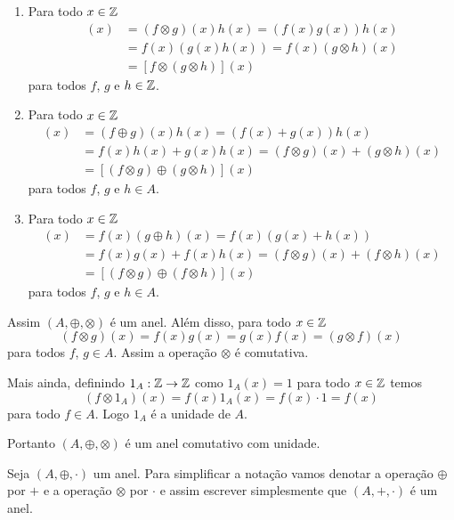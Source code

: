 \begin{exemplos}
\begin{enumerate}[label={\arabic*})]
\begin{enumerate}[label={\roman*})]
            \item Para todo $x \in \mathbb{Z}$
            \begin{align*}
                [(f \otimes g)\otimes h](x) &= (f \otimes g)(x)h(x) = (f(x)g(x))h(x)\\ &= f(x)(g(x)h(x)) = f(x)(g \otimes h)(x)\\ &= [f\otimes (g \otimes h)](x)
            \end{align*}
            para todos $f$, $g$ e $h \in \mathbb{Z}$.

            \item Para todo $x \in \mathbb{Z}$
            \begin{align*}
                [(f \oplus g)\otimes h](x) &= (f \oplus g)(x)h(x) = (f(x) + g(x))h(x) \\ &= f(x)h(x) + g(x)h(x)
                = (f\otimes g)(x) + (g \otimes h)(x)\\
                &= [(f \otimes g) \oplus (g \otimes h)](x)
            \end{align*}
            para todos $f$, $g$ e $h \in A$.

            \item Para todo $x \in \mathbb{Z}$
            \begin{align*}
                [f\otimes (g \oplus h)](x) &= f(x)(g\oplus h)(x) = f(x)(g(x) + h(x))\\
                &= f(x)g(x) + f(x)h(x) = (f\otimes g)(x) + (f\otimes h)(x)\\
                &= [(f \otimes g) \oplus (f\otimes h)](x)
            \end{align*}
            para todos $f$, $g$ e $h \in A$.
        \end{enumerate}
        Assim $(A, \oplus, \otimes)$ é um anel. Além disso, para todo $x \in \mathbb{Z}$
        \[
            (f\otimes g)(x) = f(x)g(x) = g(x)f(x) = (g\otimes f)(x)
        \]
        para todos $f$, $g \in A$. Assim a operação $\otimes$ é comutativa.

        Mais ainda, definindo $1_A : \mathbb{Z} \to \mathbb{Z}$ como $1_A(x) = 1$ para todo $x \in \mathbb{Z}$ temos
        \[
            (f \otimes 1_A)(x) = f(x)1_A(x) = f(x)\cdot 1 = f(x)
        \]
        para todo $f \in A$. Logo $1_A$ é a unidade de $A$.

        Portanto $(A, \oplus, \otimes)$ é um anel comutativo com unidade.
    \end{enumerate}
\end{exemplos}

\begin{observacao}
    Seja $(A, \oplus, \cdot)$ um anel. Para simplificar a notação vamos denotar a operação $\oplus$
    por $+$ e a operação $\otimes$ por $\cdot$ e assim escrever simplesmente que $(A, +, \cdot)$ é um anel.
\end{observacao}


